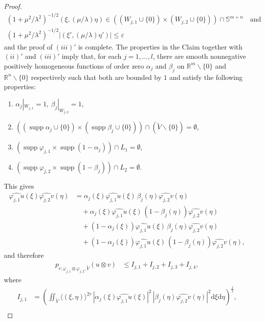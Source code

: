 \documentclass{amsart}
\newcommand{\supp}{\operatorname{supp}}
\theoremstyle{definition}
\begin{document}
\begin{proof}
\begin{gather*}
(1+\mu^2/\lambda^2)^{-1/2}(\xi,(\mu/\lambda)\eta)\in((W_{j,1}\cup\{0\})\times(W_{j,2}\cup\{0\}))\cap\mathbb{S}^{m+n}\quad\mbox{and}\\
(1+\mu^2/\lambda^2)^{-1/2}|(\xi',(\mu/\lambda)\eta')|\leq \varepsilon
\end{gather*}
and the proof of $(iii)'$ is complete. The properties in the Claim together with $(ii)'$ and $(iii)'$ imply that, for each $j=1,\ldots,l$, there are smooth nonnegative positively homogeneous functions of order zero $\alpha_j$ and $\beta_j$ on $\mathbb{R}^m\backslash\{0\}$ and $\mathbb{R}^n\backslash\{0\}$ respectively such that both are bounded by $1$ and satisfy the following properties:
\begin{enumerate}
\item
$\alpha_j|_{W_{j,1}} = 1, \ \beta_j|_{W_{j,2}} = 1$,
\item
$((\supp \alpha_j\cup\{0\}) \times (\supp \beta_j\cup\{0\})) \cap (\widetilde{V}\backslash\{0\}) = \emptyset$,
\item
$(\supp\varphi_{j,1}\times \supp (1-\alpha_j)) \cap L_1 = \emptyset$,
\item
$(\supp\varphi_{j,2} \times \supp (1-\beta_j)) \cap L_2 = \emptyset$.
\end{enumerate}
This gives
\begin{align*}
\widehat{\varphi_{j,1} u} (\xi) \widehat{\varphi_{j,2} v} (\eta) &= \alpha_j (\xi) \widehat{\varphi_{j,1} u} (\xi) \, \beta_j (\eta) \widehat{\varphi_{j,2} v} (\eta)\\
& \quad + \alpha_j (\xi) \widehat{\varphi_{j,1} u} (\xi) \, (1 - \beta_j (\eta)) \widehat{\varphi_{j,2} v} (\eta)\\
& \quad + ( 1 - \alpha_j (\xi))  \widehat{\varphi_{j,1} u} (\xi) \, \beta_j (\eta) \widehat{\varphi_{j,2} v} (\eta) \\
& \quad +  ( 1 - \alpha_j (\xi))  \widehat{\varphi_{j,1} u} (\xi) \, (1 - \beta_j (\eta)) \widehat{\varphi_{j,2} v} (\eta),
\end{align*}
and therefore
\begin{align*}
p_{r; \varphi_{j,1} \otimes \varphi_{j,2} , \widetilde{V}} (u \otimes v)
&\leq I_{j,1} + I_{j,2} + I_{j,3} + I_{j,4},
\end{align*}
where
\begin{align*}
I_{j,1}
&= \left( \iint_{\widetilde{V}} \langle (\xi , \eta) \rangle^{2r} \, |\alpha_j (\xi) \widehat{\varphi_{j,1} u} (\xi) |^2 \, |\beta_j (\eta) \widehat{\varphi_{j,2} v} (\eta)|^2 \mathrm{d}\xi \mathrm{d}\eta \right)^{\frac{1}{2}} ,\\

\end{align*}
\end{proof}
\end{document}
